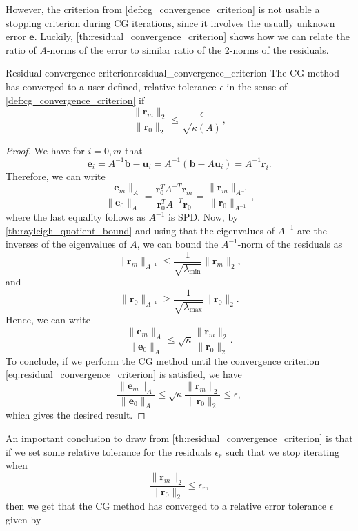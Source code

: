 However, the criterion from \cref{def:cg_convergence_criterion} is not usable a stopping criterion during CG iterations, since it involves the usually unknown error $\mathbf{e}$. Luckily, \cref{th:residual_convergence_criterion} shows how we can relate the ratio of $A$-norms of the error to similar ratio of the 2-norms of the residuals.
\begin{fancyth}{Residual convergence criterion}{residual_convergence_criterion}
  The CG method has converged to a user-defined, relative tolerance $\epsilon$ in the sense of \cref{def:cg_convergence_criterion} if
  \begin{equation}
    \frac{\|\mathbf{r}_m\|_2}{\|\mathbf{r}_0\|_2} \leq \frac{\epsilon}{\sqrt{\kappa(A)}},
    \label{eq:residual_convergence_criterion}
  \end{equation}
\end{fancyth}
\begin{proof}
  We have for $i=0,m$ that
  \[
    \mathbf{e}_i = A^{-1}\mathbf{b} - \mathbf{u}_i = A^{-1}(\mathbf{b} - A\mathbf{u}_i) = A^{-1}\mathbf{r}_i.
  \]
  Therefore, we can write
  \[
    \frac{\|\mathbf{e}_m\|_A}{\|\mathbf{e}_0\|_A} = \frac{\mathbf{r}_0^TA^{-T}\mathbf{r}_m}{\mathbf{r}_0^TA^{-T}\mathbf{r}_0} = \frac{\|\mathbf{r}_m\|_{A^{-1}}}{\|\mathbf{r}_0\|_{A^{-1}}},
  \]
  where the last equality follows as $A^{-1}$ is SPD. Now, by \cref{th:rayleigh_quotient_bound} and using that the eigenvalues of $A^{-1}$ are the inverses of the eigenvalues of $A$, we can bound the $A^{-1}$-norm of the residuals as
  \[
    \|\mathbf{r}_m\|_{A^{-1}}  \leq \frac{1}{\sqrt{\lambda_{\text{min}}}} \|\mathbf{r}_m\|_2,
  \]
  and
  \[
    \|\mathbf{r}_0\|_{A^{-1}} \geq \frac{1}{\sqrt{\lambda_{\text{max}}}} \|\mathbf{r}_0\|_2.
  \]
  Hence, we can write
  \[
    \frac{\|\mathbf{e}_m\|_A}{\|\mathbf{e}_0\|_A} \leq \sqrt{\kappa} \frac{\|\mathbf{r}_m\|_2}{\|\mathbf{r}_0\|_2}.
  \]
  To conclude, if we perform the CG method until the convergence criterion \cref{eq:residual_convergence_criterion} is satisfied, we have
  \[
    \frac{\|\mathbf{e}_m\|_A}{\|\mathbf{e}_0\|_A} \leq \sqrt{\kappa} \frac{\|\mathbf{r}_m\|_2}{\|\mathbf{r}_0\|_2} \leq \epsilon,
  \]
  which gives the desired result.
\end{proof}
An important conclusion to draw from \cref{th:residual_convergence_criterion} is that if we set some relative tolerance for the residuals $\epsilon_r$ such that we stop iterating when
\[
  \frac{\|\mathbf{r}_m\|_2}{\|\mathbf{r}_0\|_2} \leq \epsilon_r,
\]
then we get that the CG method has converged to a relative error tolerance $\epsilon$ given by
